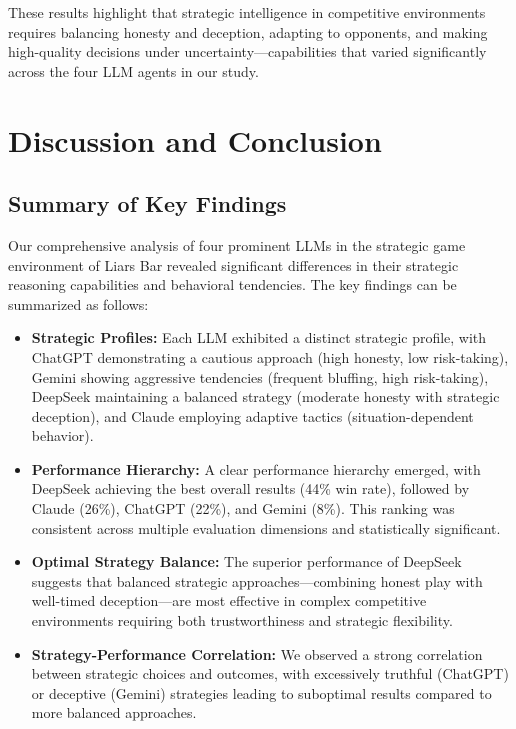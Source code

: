 \documentclass{article}
\begin{document}
These results highlight that strategic intelligence in competitive environments requires balancing 
honesty and deception, adapting to opponents, and making high-quality decisions under 
uncertainty—capabilities that varied significantly across the four LLM agents in our study.

\section{Discussion and Conclusion}

\subsection{Summary of Key Findings}
Our comprehensive analysis of four prominent LLMs in the strategic game environment of Liars Bar revealed significant differences in their strategic reasoning capabilities and behavioral tendencies. The key findings can be summarized as follows:

\begin{itemize}
    \item \textbf{Strategic Profiles:} Each LLM exhibited a distinct strategic profile, with ChatGPT demonstrating a cautious approach (high honesty, low risk-taking), Gemini showing aggressive tendencies (frequent bluffing, high risk-taking), DeepSeek maintaining a balanced strategy (moderate honesty with strategic deception), and Claude employing adaptive tactics (situation-dependent behavior).
    
    \item \textbf{Performance Hierarchy:} A clear performance hierarchy emerged, with DeepSeek achieving the best overall results (44\% win rate), followed by Claude (26\%), ChatGPT (22\%), and Gemini (8\%). This ranking was consistent across multiple evaluation dimensions and statistically significant.
    
    \item \textbf{Optimal Strategy Balance:} The superior performance of DeepSeek suggests that balanced strategic approaches—combining honest play with well-timed deception—are most effective in complex competitive environments requiring both trustworthiness and strategic flexibility.
    
    \item \textbf{Strategy-Performance Correlation:} We observed a strong correlation between strategic choices and outcomes, with excessively truthful (ChatGPT) or deceptive (Gemini) strategies leading to suboptimal results compared to more balanced approaches.
\end{itemize}
\end{document}
